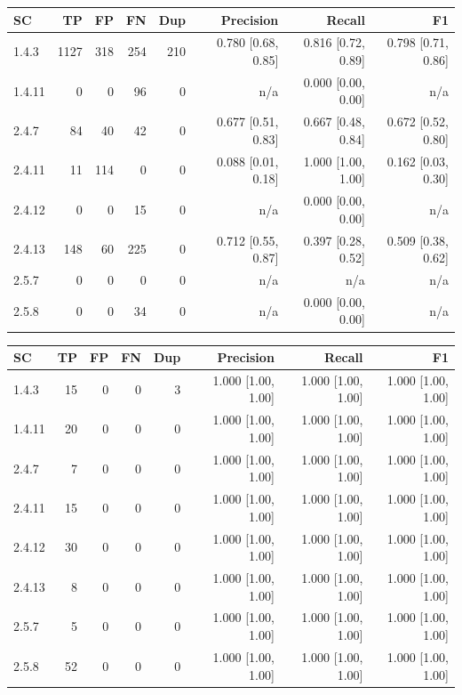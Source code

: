 \begin{tabular}{lrrrrrrr}
\hline
SC & TP & FP & FN & Dup & Precision & Recall & F1 \\
\hline
1.4.3 & 1127 & 318 & 254 & 210 & 0.780 [0.68, 0.85] & 0.816 [0.72, 0.89] & 0.798 [0.71, 0.86] \\
1.4.11 & 0 & 0 & 96 & 0 & n/a & 0.000 [0.00, 0.00] & n/a \\
2.4.7 & 84 & 40 & 42 & 0 & 0.677 [0.51, 0.83] & 0.667 [0.48, 0.84] & 0.672 [0.52, 0.80] \\
2.4.11 & 11 & 114 & 0 & 0 & 0.088 [0.01, 0.18] & 1.000 [1.00, 1.00] & 0.162 [0.03, 0.30] \\
2.4.12 & 0 & 0 & 15 & 0 & n/a & 0.000 [0.00, 0.00] & n/a \\
2.4.13 & 148 & 60 & 225 & 0 & 0.712 [0.55, 0.87] & 0.397 [0.28, 0.52] & 0.509 [0.38, 0.62] \\
2.5.7 & 0 & 0 & 0 & 0 & n/a & n/a & n/a \\
2.5.8 & 0 & 0 & 34 & 0 & n/a & 0.000 [0.00, 0.00] & n/a \\
\hline
\end{tabular}

\begin{tabular}{lrrrrrrr}
\hline
SC & TP & FP & FN & Dup & Precision & Recall & F1 \\
\hline
1.4.3 & 15 & 0 & 0 & 3 & 1.000 [1.00, 1.00] & 1.000 [1.00, 1.00] & 1.000 [1.00, 1.00] \\
1.4.11 & 20 & 0 & 0 & 0 & 1.000 [1.00, 1.00] & 1.000 [1.00, 1.00] & 1.000 [1.00, 1.00] \\
2.4.7 & 7 & 0 & 0 & 0 & 1.000 [1.00, 1.00] & 1.000 [1.00, 1.00] & 1.000 [1.00, 1.00] \\
2.4.11 & 15 & 0 & 0 & 0 & 1.000 [1.00, 1.00] & 1.000 [1.00, 1.00] & 1.000 [1.00, 1.00] \\
2.4.12 & 30 & 0 & 0 & 0 & 1.000 [1.00, 1.00] & 1.000 [1.00, 1.00] & 1.000 [1.00, 1.00] \\
2.4.13 & 8 & 0 & 0 & 0 & 1.000 [1.00, 1.00] & 1.000 [1.00, 1.00] & 1.000 [1.00, 1.00] \\
2.5.7 & 5 & 0 & 0 & 0 & 1.000 [1.00, 1.00] & 1.000 [1.00, 1.00] & 1.000 [1.00, 1.00] \\
2.5.8 & 52 & 0 & 0 & 0 & 1.000 [1.00, 1.00] & 1.000 [1.00, 1.00] & 1.000 [1.00, 1.00] \\
\hline
\end{tabular}

